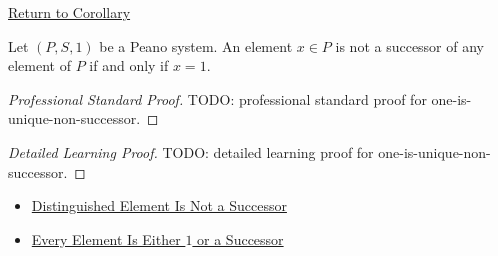 \newpage
{}
\label{prf:one-is-unique-non-successor}

\begin{remark*}[Return]
\hyperref[cor:one-is-unique-non-successor]{Return to Corollary}
\end{remark*}

\begin{corollary*}
Let $(P,S,1)$ be a Peano system. An element $x \in P$ is not a successor of
any element of $P$ if and only if $x=1$.
\end{corollary*}

\begin{proof}[Professional Standard Proof]
\LRAProofBodyStart
TODO: professional standard proof for one-is-unique-non-successor.
\end{proof}

\begin{proof}[Detailed Learning Proof]
\LRAProofBodyStart
TODO: detailed learning proof for one-is-unique-non-successor.
\end{proof}

\begin{remark*}
\end{remark*}

\begin{dependencies}
\begin{itemize}
  \item \hyperref[ax:peano-base-not-successor]{Distinguished Element Is Not a Successor}
  \item \hyperref[thm:every-element-is-one-or-a-successor]{Every Element Is Either $1$ or a Successor}
\end{itemize}
\end{dependencies}


\clearpage
